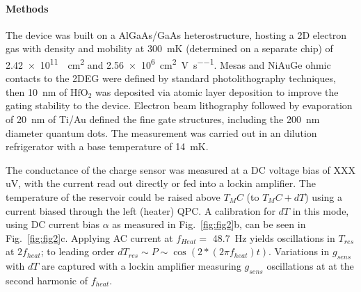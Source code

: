 \documentclass[preprint,showpacs,preprintnumbers,amsmath,amssymb,pra,aps,superscriptaddress]{revtex4-1}
\begin{document}
\paragraph*{Methods} The device was built on a AlGaAs/GaAs heterostructure, hosting a 2D electron gas with density and mobility at \SI{300}{\milli\kelvin} (determined on a separate chip) of \SI{2.42e11}{\per\square\centi\metre} and \SI[per-mode=symbol]{2.56e6}{\square\centi\metre\per\volt\per\second}.   Mesas and NiAuGe ohmic contacts to the 2DEG were defined by standard photolithography techniques, then \SI{10}{\nano\metre} of $\mathrm{HfO_2}$ was deposited via atomic layer deposition to improve the gating stability to the device. Electron beam lithography followed by evaporation of \SI{20}{\nano\metre} of Ti/Au defined the fine gate structures, including the \SI{200}{\nano\metre} diameter quantum dots. The measurement was carried out in an dilution refrigerator with a base temperature of \SI{14}{\milli\kelvin}.

The conductance of the charge sensor was measured at a DC voltage bias of XXX uV, with the current read out directly or fed into a lockin amplifier.  The temperature of the reservoir could be raised above $T_MC$ (to $T_MC + dT$) using a current biased through the left (heater) QPC. A calibration for $dT$ in this mode, using DC current bias $\alpha$ as measured in Fig.~\ref{fig:fig2}b, can be seen in Fig.~\ref{fig:fig2}c. Applying AC current at $f_{Heat} =$ \SI{48.7}{\hertz} yields oscillations in $T_{res}$ at $2f_{heat}$; to leading order $dT_{res} \sim P \sim \cos(2*(2 \pi f_{heat})t)$. Variations in $g_{sens}$ with $dT$ are captured with a lockin amplifier measuring $g_{sens}$ oscillations at at the second harmonic of $f_{heat}$. 



{}

\end{document}
